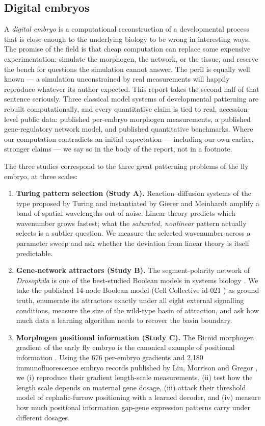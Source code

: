 \subsection{Digital embryos}

A \emph{digital embryo} is a computational reconstruction of a developmental
process that is close enough to the underlying biology to be wrong in
interesting ways. The promise of the field is that cheap computation can
replace some expensive experimentation: simulate the morphogen, the network,
or the tissue, and reserve the bench for questions the simulation cannot
answer. The peril is equally well known --- a simulation unconstrained by real
measurements will happily reproduce whatever its author expected. This report
takes the second half of that sentence seriously. Three classical model
systems of developmental patterning are rebuilt computationally, and every
quantitative claim is tied to real, accession-level public data: published
per-embryo morphogen measurements, a published gene-regulatory network model,
and published quantitative benchmarks. Where our computation contradicts an
initial expectation --- including our own earlier, stronger claims --- we say
so in the body of the report, not in a footnote.

The three studies correspond to the three great patterning problems of the
fly embryo, at three scales:

\begin{enumerate}
\item \textbf{Turing pattern selection (Study A).} Reaction--diffusion
systems of the type proposed by Turing \cite{turing1952} and instantiated by
Gierer and Meinhardt \cite{gierer1972} amplify a band of spatial wavelengths
out of noise. Linear theory predicts which wavenumber grows fastest; what the
\emph{saturated, nonlinear} pattern actually selects is a subtler question.
We measure the selected wavenumber across a parameter sweep and ask whether
the deviation from linear theory is itself predictable.
\item \textbf{Gene-network attractors (Study B).} The segment-polarity
network of \emph{Drosophila} is one of the best-studied Boolean models in
systems biology \cite{vondassow2000,albert2003}. We take the published
14-node Boolean model (Cell Collective id-021 \cite{helikar2012}) as ground
truth, enumerate its attractors exactly under all eight external signalling
conditions, measure the size of the wild-type basin of attraction, and ask
how much data a learning algorithm needs to recover the basin boundary.
\item \textbf{Morphogen positional information (Study C).} The Bicoid
morphogen gradient of the early fly embryo is the canonical example of
positional information \cite{wolpert1969,gregor2007}. Using the 676
per-embryo gradients and 2{,}180 immunofluorescence embryo records published
by Liu, Morrison and Gregor \cite{liu2013}, we (i) reproduce their gradient
length-scale measurements, (ii) test how the length scale depends on maternal
gene dosage, (iii) attack their threshold model of cephalic-furrow
positioning with a learned decoder, and (iv) measure how much positional
information gap-gene expression patterns carry under different dosages.
\end{enumerate}

